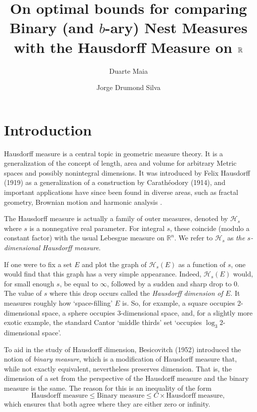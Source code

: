 \documentclass[11pt, reqno]{amsart}
\title[\textbf{Optimal bounds for $b$-ary measures}]{\textbf{On optimal bounds for comparing Binary (and $b$-ary) Nest Measures with the Hausdorff Measure on $\R$}}
\author{Duarte Maia}
\author{Jorge Drumond Silva}
\date{}
\newcommand{\R}{\mathbb{R}}
\newcommand{\HH}{\mathcal{H}}
\begin{document}
\begin{abstract}
\lipsum[1]
\end{abstract}

\maketitle


\section{Introduction}

Hausdorff measure is a central topic in geometric measure theory. It is a generalization of the concept of length, area and volume for arbitrary Metric spaces and possibly nonintegral dimensions. It was introduced by Felix Hausdorff (1919) as a generalization of a construction by Carathéodory (1914), and important applications have since been found in diverse areas, such as fractal geometry, Brownian motion \cite{brownian} and harmonic analysis \cite{fefferman}.

The Hausdorff measure is actually a family of outer measures, denoted by $\HH_s$ where $s$ is a nonnegative real parameter. For integral $s$, these coincide (modulo a constant factor) with the usual Lebesgue measure on $\R^n$. We refer to $\HH_s$ as \emph{the $s$-dimensional Hausdorff measure}.

If one were to fix a set $E$ and plot the graph of $\HH_s(E)$ as a function of $s$, one would find that this graph has a very simple appearance. Indeed, $\HH_s(E)$ would, for small enough $s$, be equal to $\infty$, followed by a sudden and sharp drop to 0. The value of $s$ where this drop occurs called the \emph{Hausdorff dimension of $E$}. It measures roughly how `space-filling' $E$ is. So, for example, a square occupies 2-dimensional space, a sphere occupies 3-dimensional space, and, for a slightly more exotic example, the standard Cantor `middle thirds' set `occupies $\log_3 2$-dimensional space'.

To aid in the study of Hausdorff dimension, Besicovitch (1952) introduced the notion of \emph{binary measure}, which is a modification of Hausdorff measure that, while not exactly equivalent, nevertheless preserves dimension. That is, the dimension of a set from the perspective of the Hausdorff measure and the binary measure is the same. The reason for this is an inequality of the form
\begin{equation}\label{hbineq1}
\text{Hausdorff measure} \leq \text{Binary measure} \leq C \times \text{Hausdorff measure},
\end{equation}
which ensures that both agree where they are either zero or infinity.
\end{document}
